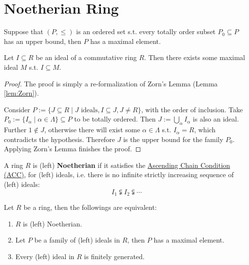 \documentclass{article}
\begin{document}
\newpage
\section{Noetherian Ring}

\begin{lemma} \label{lem:Zorn}
    Suppose that $(P, \leq)$ is an ordered set s.t. every totally order subset $P_0 \subseteq P$ has an upper bound, then $P$ has a maximal element. 
\end{lemma}

\begin{theorem} \label{thm:maximal ideal inclusion}
    Let $I \subseteq R$ be an ideal of a commutative ring $R$. Then there exists some maximal ideal $M$ s.t. $I \subseteq M$.
\end{theorem}

\begin{proof}
    The proof is simply a re-formalization of Zorn's Lemma (Lemma \ref{lem:Zorn}). 
    
    Consider $P := \{ J \subseteq R \mid J \text{ ideals}, I \subseteq J, J \neq R \}$, with the order of inclusion. Take $P_0 := \{I_{\alpha} \mid \alpha\in \Lambda\} \subseteq P$ to be totally ordered. Then $J := \bigcup_{\alpha} I_{\alpha}$ is also an ideal. Further $1\notin J$, otherwise there will exist some $\alpha\in \Lambda$ s.t. $I_{\alpha} = R$, which contradicts the hypothesis. Therefore $J$ is the upper bound for the family $P_0$. Applying Zorn's Lemma finishes the proof. 
\end{proof}

\begin{definition}
    A ring $R$ is (left) \textbf{Noetherian} if it satisfies the \underline{Ascending Chain Condition (ACC)}, for (left) ideals, i.e. there is no infinite strictly increasing sequence of (left) ideals:
    \[
        I_1 \subsetneqq I_2 \subsetneqq \cdots
    \]
\end{definition}

\begin{proposition}\label{prop:Noeth f.g.}
    Let $R$ be a ring, then the followings are equivalent:
    \begin{enumerate}
        \item $R$ is (left) Noetherian.
        \item Let $P$ be a family of (left) ideals in $R$, then $P$ has a maximal element.
        \item Every (left) ideal in $R$ is finitely generated.  
    \end{enumerate}
\end{proposition}
\end{document}
